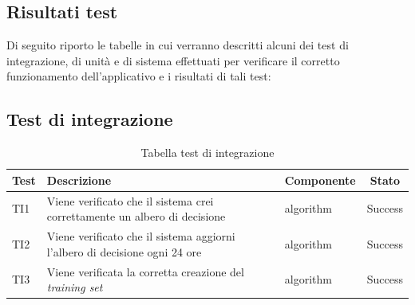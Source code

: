 \subsection{Risultati test}
Di seguito riporto le tabelle in cui verranno descritti alcuni dei test di integrazione, di unità e di sistema effettuati per verificare il corretto funzionamento dell'applicativo e i risultati di tali test:
\newpage
\subsection*{Test di integrazione}
\begin{center}
	\begin{table}[h]
		\begin{tabular}{|l|p{}|l|c|}
			\toprule
			
			\textbf{Test} & \textbf{Descrizione} & Componente & \textbf{Stato} \\
			
			\midrule
			TI1 & Viene verificato che il sistema crei correttamente un albero di decisione & algorithm &  Success \\ \midrule
			TI2 & Viene verificato che il sistema aggiorni l'albero di decisione ogni 24 ore & algorithm & Success \\ \midrule
			TI3 & Viene verificata la corretta creazione del \textit{training set} & algorithm & Success \\ 
			\bottomrule
			
		\end{tabular}
		\caption{Tabella test di integrazione}
		
	\end{table}
	
\end{center}


